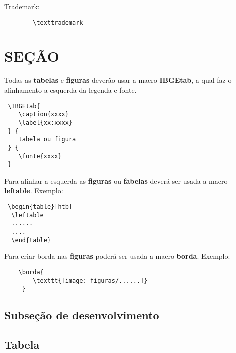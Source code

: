 	\texttrademark Trademark:
		\begin{verbatim}
		\texttrademark
		\end{verbatim}
\section{SEÇÃO}

 Todas as \textbf{tabelas} e \textbf{figuras} deverão usar a macro \textbf{IBGEtab}, a qual faz o alinhamento a esquerda da legenda e fonte.
 \begin{verbatim}
 \IBGEtab{
 	\caption{xxxx} 
 	\label{xx:xxxx}
 } {
 	tabela ou figura
 } {
 	\fonte{xxxx}
 }
 \end{verbatim} 
 
 Para alinhar a esquerda as \textbf{figuras} ou \textbf{fabelas} deverá ser usada a macro  \textbf{leftable}. Exemplo:
 \begin{verbatim}
 \begin{table}[htb]
  \leftable
  ......
  ....
  \end{table}
 \end{verbatim}
 
 Para criar borda nas \textbf{figuras} poderá ser usada a macro \textbf{borda}. Exemplo:
 \begin{verbatim}
 	\borda{
  		\texttt{[image: figuras/......]}
     }
 \end{verbatim}
\subsection{Subseção de desenvolvimento}

\lipsum[1-1]

\subsection{Tabela}
\begin{table}[htb]
  \leftable  %
\end{table}

